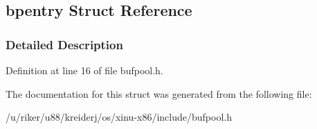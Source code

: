 \hypertarget{structbpentry}{}\subsection{bpentry Struct Reference}
\label{structbpentry}


\subsubsection{Detailed Description}


Definition at line 16 of file bufpool.\+h.



The documentation for this struct was generated from the following file\+:\begin{DoxyCompactItemize}
\item 
/u/riker/u88/kreiderj/os/xinu-\/x86/include/bufpool.\+h\end{DoxyCompactItemize}

